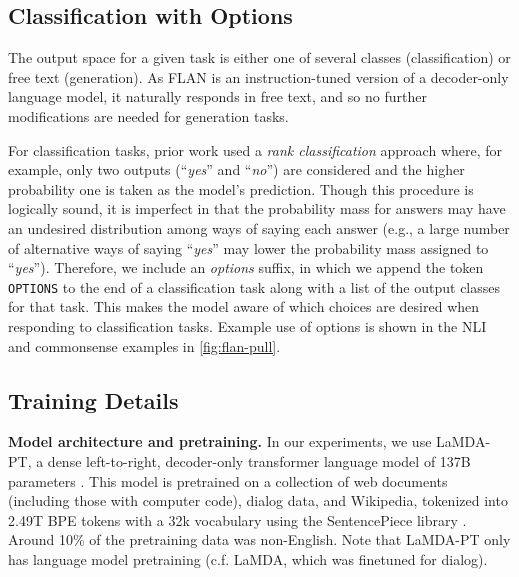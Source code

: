 \documentclass{article} \usepackage{iclr2022_conference,times}
\newcommand{\textttsmall}[1]{\texttt{{\small#1}}}
\newcommand{\flan}{FLAN}
\newcommand{\baselm}{LaMDA-PT}
\begin{document}
\subsection{Classification with Options}\label{subsec:options}
\vspace{-1mm}
The output space for a given task is either one of several classes (classification) or free text (generation). 
As \flan{} is an instruction-tuned version of a decoder-only language model, it naturally responds in free text, and so no further modifications are needed for generation tasks.

For classification tasks, prior work \citep{brown2020language} used a \textit{rank classification} approach where, for example, only two outputs (``\textit{yes}'' and ``\textit{no}'') are considered and the higher probability one is taken as the model's prediction.
Though this procedure is logically sound, it is imperfect in that the probability mass for answers may have an undesired distribution among ways of saying each answer (e.g., a large number of alternative ways of saying ``\textit{yes}'' may lower the probability mass assigned to ``\textit{yes}'').
Therefore, we include an \textit{options} suffix, in which we append the token \textttsmall{OPTIONS} to the end of a classification task along with a list of the output classes for that task.
This makes the model aware of which choices are desired when responding to classification tasks.
Example use of options is shown in the NLI and commonsense examples in \cref{fig:flan-pull}.

\vspace{-1mm}
\subsection{Training Details}
\vspace{-1mm}

\textbf{Model architecture and pretraining.} 
In our experiments, we use \baselm{}, a dense left-to-right, decoder-only transformer language model of 137B parameters \citep{thoppilan2022lamda}.
This model is pretrained on a collection of web documents (including those with computer code), dialog data, and Wikipedia, tokenized into 2.49T BPE tokens with a 32k vocabulary using the SentencePiece library \citep{sentencepiece}. 
Around 10\% of the pretraining data was non-English.
Note that \baselm{} only has language model pretraining (c.f. LaMDA, which was finetuned for dialog).
\end{document}
